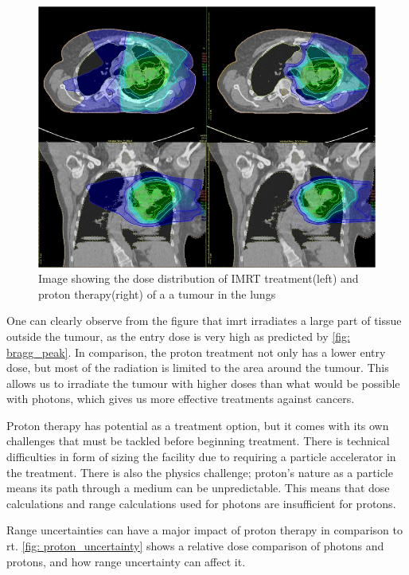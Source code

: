 \documentclass[main.tex]{subfiles}
\begin{document}
\begin{figure}[!htpb]
    \centering
    \includegraphics[width=12cm ]{images/proton_vs_imrt.png}
    \caption{Image showing the dose distribution of IMRT treatment(left) and proton therapy(right) of a a tumour in the lungs\cite{protonimage}}
    \label{fig: imrt_vs_photon}
\end{figure}
\FloatBarrier

One can clearly observe from the figure that \gls{imrt} irradiates a large part of tissue outside the tumour, as the entry dose is very high as predicted by \autoref{fig: bragg_peak}. In comparison, the proton treatment not only has a lower entry dose, but most of the radiation is limited to the area around the tumour. This allows us to irradiate the tumour with higher doses than what would be possible with photons, which gives us more effective treatments against cancers.

Proton therapy has potential as a treatment option, but it comes with its own challenges that must be tackled before beginning treatment. There is technical difficulties in form of sizing the facility due to requiring a particle accelerator in the treatment. There is also the physics challenge; proton's nature as a particle means its path through a medium can be unpredictable. This means that dose calculations and range calculations used for photons are insufficient for protons.\cite{proton_challenges}

Range uncertainties can have a major impact of proton therapy in comparison to \gls{rt}. \autoref{fig: proton_uncertainty} shows a relative dose comparison of photons and protons, and how range uncertainty can affect it.
\end{document}
